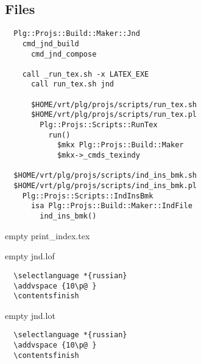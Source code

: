  
 
 
 
 

\subsection{Files}

\begin{Verbatim}
  Plg::Projs::Build::Maker::Jnd
    cmd_jnd_build
      cmd_jnd_compose

    call _run_tex.sh -x LATEX_EXE
      call run_tex.sh jnd
  
      $HOME/vrt/plg/projs/scripts/run_tex.sh
      $HOME/vrt/plg/projs/scripts/run_tex.pl
        Plg::Projs::Scripts::RunTex
          run()
            $mkx Plg::Projs::Build::Maker
            $mkx->_cmds_texindy

  $HOME/vrt/plg/projs/scripts/ind_ins_bmk.sh
  $HOME/vrt/plg/projs/scripts/ind_ins_bmk.pl
    Plg::Projs::Scripts::IndInsBmk
      isa Plg::Projs::Build::Maker::IndFile
        ind_ins_bmk()
\end{Verbatim}

empty print\_index.tex

empty jnd.lof

\begin{Verbatim}
  \selectlanguage *{russian}
  \addvspace {10\p@ }
  \contentsfinish
\end{Verbatim}

empty jnd.lot

\begin{Verbatim}
  \selectlanguage *{russian}
  \addvspace {10\p@ }
  \contentsfinish
\end{Verbatim}
